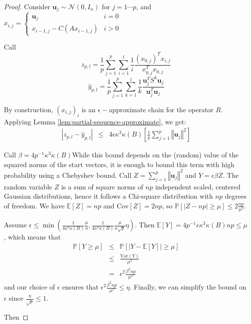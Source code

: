 \begin{proof}

Consider $\mathbf{u}_{j}\sim\mathcal{N}\left(0,I_{n}\right)$ for
$j=1\cdots p$, and $x_{i,j}=\begin{cases}
\mathbf{u}_{j} & i=0\\
x_{i-1,j}-C\left(Ax_{i-1,j}\right) & i>0
\end{cases}$

Call 
\[
z_{p,l}=\frac{1}{p}\sum_{j=1}^{p}\sum_{i=1}^{l}\frac{1}{i}\frac{\left(x_{0,j}\right)^{T}x_{i,j}}{x_{0,j}^{T}x_{0,j}}
\]
\[
\hat{y}_{p,l}=\frac{1}{p}\sum_{j=1}^{p}\sum_{k=1}^{l}\frac{1}{k}\frac{\mathbf{u}_{j}^{T}S^{k}\mathbf{u}_{j}}{\mathbf{u}_{j}^{T}\mathbf{u}_{j}}
\]


By construction, $\left(x_{i,j}\right)_{i}$ is an $\epsilon-$approximate
chain for the operator $R$. Applying Lemma \ref{lem:partial-sequence-approximate},
we get:
\begin{eqnarray*}
\left|z_{p,l}-\hat{y}_{p,l}\right| & \leq & 4\epsilon\kappa^{3}\kappa\left(B\right)\left[\frac{1}{p}\sum_{j=1}^{p}\left\Vert \mathbf{u}_{j}\right\Vert ^{2}\right]
\end{eqnarray*}


Call $\beta=4p^{-1}\kappa^{3}\kappa\left(B\right)$While this bound
depends on the (random) value of the squared norms of the start vectors,
it is enough to bound this term with high probability using a Chebyshev
bound. Call $Z=\sum_{j=1}^{p}\left\Vert \mathbf{u}_{j}\right\Vert ^{2}$
and $Y=\epsilon\beta Z$. The random variable $Z$ is a sum of square
norms of $np$ independent scaled, centered Gaussian distributions,
hence it follows a Chi-square distribution with $np$ degrees of freedom.
We have $\mathbb{E}\left[Z\right]=np$ and $\text{Cov}\left[Z\right]=2np$,
so $\mathbb{P}\left[\left|Z-np\right|\geq\mu\right]\leq2\frac{np}{\mu^{2}}$.

Assume $\epsilon\leq\min\left(\frac{1}{4\kappa^{3}\kappa\left(B\right)}\frac{\mu}{n},\frac{1}{4\kappa^{3}\kappa\left(B\right)}\frac{\mu}{n\sqrt{p}}\eta\right)$.
Then $\mathbb{E}\left[Y\right]=4p^{-1}\epsilon\kappa^{3}\kappa\left(B\right)np\leq\mu$,
which means that 
\begin{eqnarray*}
\mathbb{P}\left[Y\geq\mu\right] & \leq & \mathbb{P}\left[\left|Y-\mathbb{E}\left[Y\right]\right|\geq\mu\right]\\
 & \leq & \frac{\text{Var}\left(Y\right)}{\mu^{2}}\\
 & = & \epsilon^{2}\frac{\beta^{2}np}{\mu^{2}}
\end{eqnarray*}
and our choice of $\epsilon$ ensures that $\epsilon^{2}\frac{\beta^{2}np}{\mu^{2}}\leq\eta$.
Finally, we can simplify the bound on $\epsilon$ since $\frac{\eta}{\sqrt{p}}\le1$.

Then 

\end{proof}
